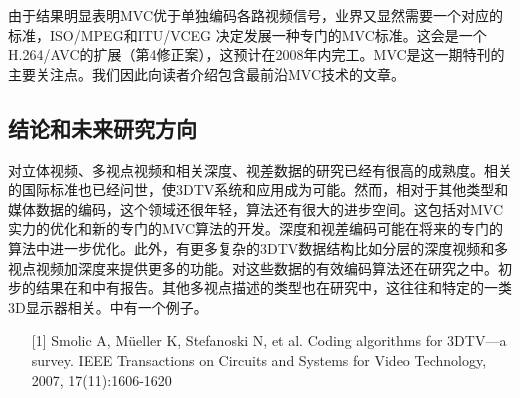 由于结果明显表明MVC优于单独编码各路视频信号，业界又显然需要一个对应的标准，ISO/MPEG和ITU/VCEG 决定发展一种专门的MVC标准\cite{vetro-joint, vetro2006joint}。这会是一个H.264/AVC的扩展（第4修正案），这预计在2008年内完工。MVC是这一期特刊的主要关注点。我们因此向读者介绍包含最前沿MVC技术的文章。

\subsection{结论和未来研究方向}

对立体视频、多视点视频和相关深度、视差数据的研究已经有很高的成熟度。相关的国际标准也已经问世，使3DTV系统和应用成为可能。然而，相对于其他类型和媒体数据的编码，这个领域还很年轻，算法还有很大的进步空间。这包括对MVC实力的优化和新的专门的MVC算法的开发。深度和视差编码可能在将来的专门的算法中进一步优化。此外，有更多复杂的3DTV数据结构比如分层的深度视频和多视点视频加深度来提供更多的功能。对这些数据的有效编码算法还在研究之中。初步的结果在和中有报告。其他多视点描述的类型也在研究中，这往往和特定的一类3D显示器相关。中有一个例子。

\begin{center}
\end{center}

\noindent \begin{enumerate}
\item[{[1]}] Smolic A, M{\"u}eller K, Stefanoski N, et al. Coding algorithms for 3DTV---a survey. IEEE Transactions on Circuits and Systems for Video Technology, 2007, 17(11):1606-1620
\end{enumerate}

